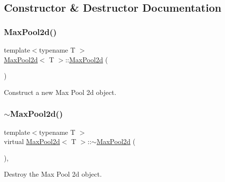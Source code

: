 \subsection{Constructor \& Destructor Documentation}
\mbox{\label{class_max_pool2d_adf1b59faff18335a4d8b7cdc9d9acad6}} 
\subsubsection{\texorpdfstring{MaxPool2d()}{MaxPool2d()}\hspace{0.1cm}{\footnotesize\ttfamily [1/2]}}
{\footnotesize\ttfamily template$<$typename T $>$ \\
\mbox{\hyperlink{class_max_pool2d}{Max\+Pool2d}}$<$ T $>$\+::\mbox{\hyperlink{class_max_pool2d}{Max\+Pool2d}} (\begin{DoxyParamCaption}{ }\end{DoxyParamCaption})\hspace{0.3cm}{\ttfamily [default]}}



Construct a new Max Pool 2d object. 

\mbox{\label{class_max_pool2d_a826785eceda78b54d150404ef24d23c3}} 
\subsubsection{\texorpdfstring{$\sim$MaxPool2d()}{~MaxPool2d()}}
{\footnotesize\ttfamily template$<$typename T $>$ \\
virtual \mbox{\hyperlink{class_max_pool2d}{Max\+Pool2d}}$<$ T $>$\+::$\sim$\mbox{\hyperlink{class_max_pool2d}{Max\+Pool2d}} (\begin{DoxyParamCaption}{ }\end{DoxyParamCaption})\hspace{0.3cm}{\ttfamily [virtual]}, {\ttfamily [default]}}



Destroy the Max Pool 2d object. 

\mbox{\label{class_max_pool2d_a5cfd5c6ae11f49fffb3d4a68f261f013}} 
